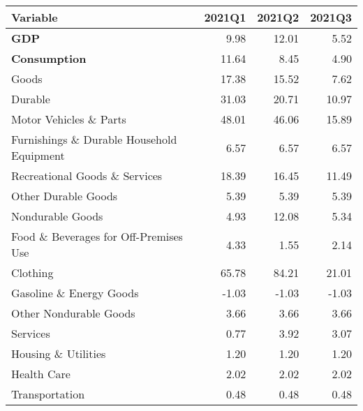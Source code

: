 \documentclass[11pt, letterpaper]{article}\usepackage[]{graphicx}\usepackage[]{color}
\begin{document}
\begin{table}[H]
\centering
\begingroup\fontsize{10pt}{12pt}\selectfont
\begin{tabular}{lrrr}
  \hline
Variable & 2021Q1 & 2021Q2 & 2021Q3 \\ 
  \hline
\hspace{0mm} \textbf{GDP} & 9.98 & 12.01 & 5.52 \\ 
  \hspace{0mm} \textbf{Consumption} & 11.64 & 8.45 & 4.90 \\ 
  \hspace{8mm}  Goods & 17.38 & 15.52 & 7.62 \\ 
  \hspace{16mm}  Durable & 31.03 & 20.71 & 10.97 \\ 
  \hspace{24mm}  Motor Vehicles \& Parts & 48.01 & 46.06 & 15.89 \\ 
  \hspace{24mm}  Furnishings \& Durable Household Equipment & 6.57 & 6.57 & 6.57 \\ 
  \hspace{24mm}  Recreational Goods \& Services & 18.39 & 16.45 & 11.49 \\ 
  \hspace{24mm}  Other Durable Goods & 5.39 & 5.39 & 5.39 \\ 
  \hspace{16mm}  Nondurable Goods & 4.93 & 12.08 & 5.34 \\ 
  \hspace{24mm}  Food \& Beverages for Off-Premises Use & 4.33 & 1.55 & 2.14 \\ 
  \hspace{24mm}  Clothing & 65.78 & 84.21 & 21.01 \\ 
  \hspace{24mm}  Gasoline \& Energy Goods & -1.03 & -1.03 & -1.03 \\ 
  \hspace{24mm}  Other Nondurable Goods & 3.66 & 3.66 & 3.66 \\ 
  \hspace{8mm}  Services & 0.77 & 3.92 & 3.07 \\ 
  \hspace{16mm}  Housing \& Utilities & 1.20 & 1.20 & 1.20 \\ 
  \hspace{16mm}  Health Care & 2.02 & 2.02 & 2.02 \\ 
  \hspace{16mm}  Transportation & 0.48 & 0.48 & 0.48 \\ 

\end{tabular}
\end{table}
\end{document}
